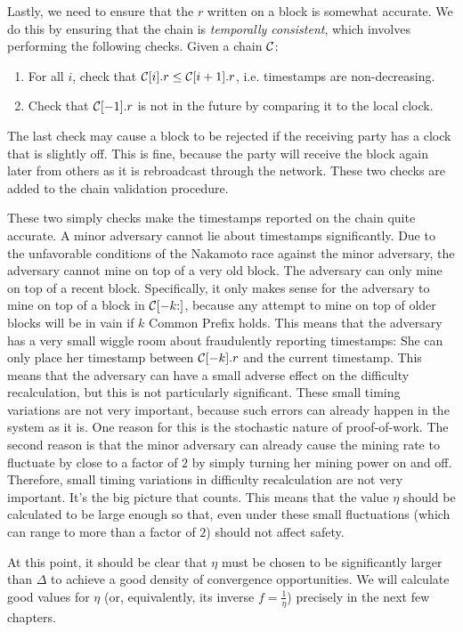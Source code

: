 Lastly, we need to ensure that the $r$ written on a block is somewhat
accurate. We do this by ensuring that the chain is \emph{temporally consistent},
which involves performing the following checks. Given a chain $\mathcal{C}$:

\begin{enumerate}
  \item For all $i$, check that $\mathcal{C}[i].r \leq \mathcal{C}[i + 1].r$, i.e. timestamps are non-decreasing.
  \item Check that $\mathcal{C}[-1].r$ is not in the future by comparing it to the local clock.
\end{enumerate}

The last check may cause a block to be rejected if the receiving party
has a clock that is slightly off. This is fine, because the party will
receive the block again later from others as it is rebroadcast through
the network. These two checks are added to the chain validation procedure.

These two simply checks make the timestamps reported on the chain quite
accurate. A minor adversary cannot lie about timestamps significantly.
Due to the unfavorable conditions of the Nakamoto race against the minor
adversary, the adversary cannot mine on top of a very old block. The
adversary can only mine on top of a recent block. Specifically, it only
makes sense for the adversary to mine on top of a block in
$\mathcal{C}[{-k}{:}]$, because any attempt to mine on top of older blocks
will be in vain if $k$ Common Prefix holds. This means that the adversary
has a very small wiggle room about fraudulently reporting timestamps:
She can only place her timestamp between $\mathcal{C}[{-k}].r$ and the current
timestamp. This means that the adversary can have a small adverse effect
on the difficulty recalculation, but this is not particularly significant.
These small timing variations are not very important, because such errors
can already happen in the system as it is. One reason for this is the
stochastic nature of proof-of-work.
The second reason is that the minor adversary can already cause the mining rate to fluctuate
by close to a factor of $2$ by simply turning her mining power on and off.
Therefore, small timing variations in difficulty recalculation are not very important.
It's the big picture that counts. This means that the value $\eta$ should be
calculated to be large enough so that, even under these small fluctuations
(which can range to more than a factor of $2$) should not affect safety.

At this point, it should be clear that $\eta$ must be chosen to be significantly
larger than $\Delta$ to achieve a good density of convergence opportunities.
We will calculate good values for $\eta$ (or, equivalently, its inverse $f = \frac{1}{\eta}$)
precisely in the next few chapters.

